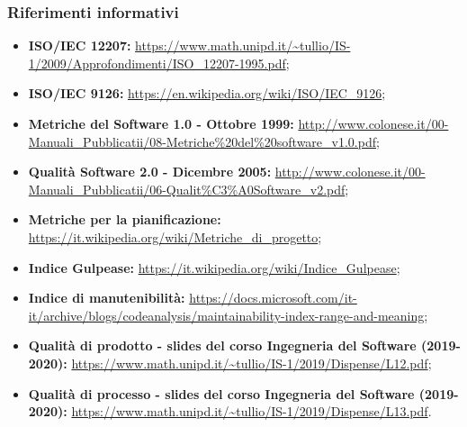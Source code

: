\subsubsection{Riferimenti informativi}
\begin{itemize}
\item \textbf{ISO/IEC 12207:} \url{https://www.math.unipd.it/~tullio/IS-1/2009/Approfondimenti/ISO_12207-1995.pdf};
\item \textbf{ISO/IEC 9126:} \url{https://en.wikipedia.org/wiki/ISO/IEC_9126};
\item \textbf{Metriche del Software 1.0 - Ottobre 1999:} \url{http://www.colonese.it/00-Manuali_Pubblicatii/08-Metriche\%20del\%20software_v1.0.pdf};
\item \textbf{Qualità Software 2.0 - Dicembre 2005:} \url{http://www.colonese.it/00-Manuali_Pubblicatii/06-Qualit\%C3\%A0Software_v2.pdf};
\item \textbf{Metriche per la pianificazione:} \url{https://it.wikipedia.org/wiki/Metriche_di_progetto};
\item \textbf{Indice Gulpease:} \url{https://it.wikipedia.org/wiki/Indice_Gulpease};
\item \textbf{Indice di manutenibilità:} \url{https://docs.microsoft.com/it-it/archive/blogs/codeanalysis/maintainability-index-range-and-meaning};
\item \textbf{Qualità di prodotto - slides del corso Ingegneria del Software (2019-2020):} \url{https://www.math.unipd.it/~tullio/IS-1/2019/Dispense/L12.pdf};
\item \textbf{Qualità di processo - slides del corso Ingegneria del Software (2019-2020):} \url{https://www.math.unipd.it/~tullio/IS-1/2019/Dispense/L13.pdf}.
\end{itemize}
